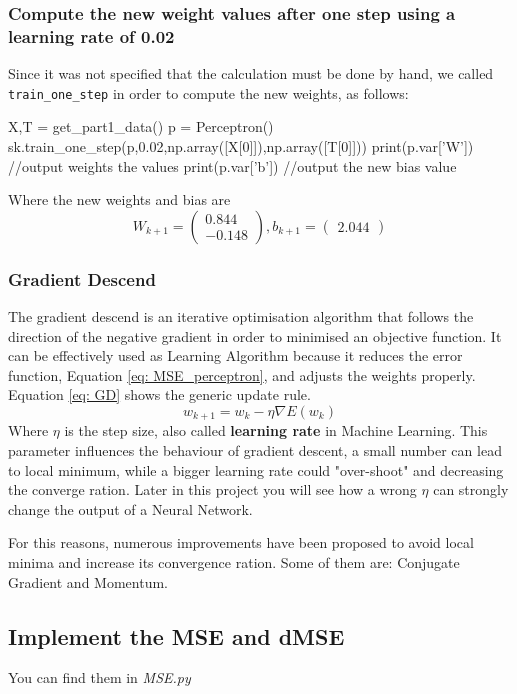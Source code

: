 \documentclass[11pt]{article}
\begin{document}
\subsubsection{Compute the new weight values after one step using a learning rate of 0.02}
Since it was not specified that the calculation must be done by hand, we called \texttt{train\_one\_step} in order to compute the new weights, as follows:
\begin{python}
X,T = get_part1_data()
p = Perceptron()
sk.train_one_step(p,0.02,np.array([X[0]]),np.array([T[0]]))
print(p.var['W']) //output weights the values	
print(p.var['b']) //output the new bias value
\end{python}
Where the new weights and bias are
$$W_{k + 1} = \begin{pmatrix}
 0.844 \\
 -0.148
\end{pmatrix}, b_{k+1} = \begin{pmatrix}
	2.044
\end{pmatrix}$$
\subsubsection{Gradient Descend}
The gradient descend is an iterative optimisation algorithm that follows the direction of the negative gradient in order to minimised an objective function. It can be effectively used as Learning Algorithm because it reduces the error function, Equation \ref{eq: MSE_perceptron}, and adjusts the weights properly. Equation \ref{eq: GD} shows the generic update rule.
\begin{equation}
\label{eq: GD}
	w_{k + 1} = w_k - \eta \nabla E(w_k)
\end{equation}
Where $\eta$ is the step size, also called \textbf{learning rate} in Machine Learning. This parameter influences the behaviour of gradient descent, a small number can lead to local minimum, while a bigger learning rate could "over-shoot" and decreasing the converge ration. Later in this project you will see how a wrong $\eta$ can strongly change the output of a Neural Network.

For this reasons, numerous improvements have been proposed to avoid local minima and increase its convergence ration. Some of them are: Conjugate Gradient and Momentum.
\subsection{Implement the MSE and dMSE}
You can find them in \emph{MSE.py}
\end{document}
